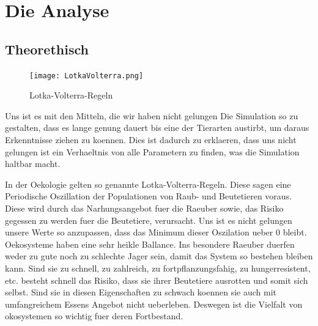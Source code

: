\documentclass[12pt]{article}
\begin{document}
\section{Die Analyse}
\subsection{Theorethisch}

\begin{figure}
        \centering
        \texttt{[image: LotkaVolterra.png]}
        \caption{Lotka-Volterra-Regeln \label{overflow}}
\end{figure}
Uns ist es mit den Mitteln, die wir haben nicht gelungen Die Simulation so zu gestalten, dass es lange genung dauert bis eine der Tierarten austirbt, um daraus Erkenntnisse ziehen zu koennen.
Dies ist dadurch zu erklaeren, dass uns nicht gelungen ist ein Verhaeltnis von alle Parametern zu finden, was die Simulation haltbar macht.

In der Oekologie gelten so genannte Lotka-Volterra-Regeln.
Diese sagen eine Periodische Oszillation der Populationen von Raub- und Beutetieren voraus.
Diese wird durch das Narhungsangebot fuer die Raeuber sowie, das Risiko gegessen zu werden fuer die Beutetiere, verursacht.
Uns ist es nicht gelungen unsere Werte so anzupassen, dass das Minimum dieser Oszilation ueber 0 bleibt.
Oekosysteme haben eine sehr heikle Ballance.
Ins besondere Raeuber duerfen weder zu gute noch zu schlechte Jager sein, damit das System so bestehen bleiben kann.
Sind sie zu schnell, zu zahlreich, zu fortpflanzungsfahig, zu hungerresistent, etc. besteht schnell das Risiko, dass sie ihrer Beutetiere ausrotten und somit sich selbst.
Sind sie in diesen Eigenschaften zu schwach koennen sie auch mit umfangreichem Essens Angebot nicht ueberleben.
Deswegen ist die Vielfalt von okosystemen so wichtig fuer deren Fortbestand.
\end{document}
